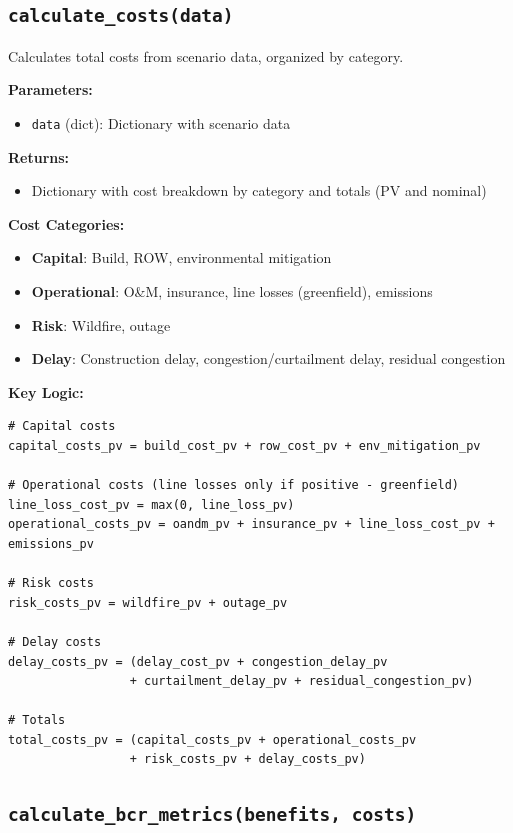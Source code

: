 \documentclass[ctcc_full_documentation.tex]{subfiles}
\begin{document}
\subsection{\texttt{calculate\_costs(data)}}

Calculates total costs from scenario data, organized by category.

\textbf{Parameters:}
\begin{itemize}
    \item \texttt{data} (dict): Dictionary with scenario data
\end{itemize}

\textbf{Returns:}
\begin{itemize}
    \item Dictionary with cost breakdown by category and totals (PV and nominal)
\end{itemize}

\textbf{Cost Categories:}
\begin{itemize}
    \item \textbf{Capital}: Build, ROW, environmental mitigation
    \item \textbf{Operational}: O\&M, insurance, line losses (greenfield), emissions
    \item \textbf{Risk}: Wildfire, outage
    \item \textbf{Delay}: Construction delay, congestion/curtailment delay, residual congestion
\end{itemize}

\textbf{Key Logic:}
\begin{lstlisting}
# Capital costs
capital_costs_pv = build_cost_pv + row_cost_pv + env_mitigation_pv

# Operational costs (line losses only if positive - greenfield)
line_loss_cost_pv = max(0, line_loss_pv)
operational_costs_pv = oandm_pv + insurance_pv + line_loss_cost_pv + emissions_pv

# Risk costs
risk_costs_pv = wildfire_pv + outage_pv

# Delay costs
delay_costs_pv = (delay_cost_pv + congestion_delay_pv 
                 + curtailment_delay_pv + residual_congestion_pv)

# Totals
total_costs_pv = (capital_costs_pv + operational_costs_pv 
                 + risk_costs_pv + delay_costs_pv)
\end{lstlisting}

\subsection{\texttt{calculate\_bcr\_metrics(benefits, costs)}}
\end{document}
